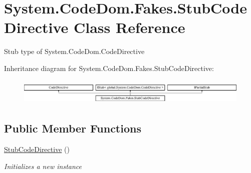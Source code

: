 \hypertarget{class_system_1_1_code_dom_1_1_fakes_1_1_stub_code_directive}{\section{System.\-Code\-Dom.\-Fakes.\-Stub\-Code\-Directive Class Reference}
\label{class_system_1_1_code_dom_1_1_fakes_1_1_stub_code_directive}
}


Stub type of System.\-Code\-Dom.\-Code\-Directive 


Inheritance diagram for System.\-Code\-Dom.\-Fakes.\-Stub\-Code\-Directive\-:\begin{figure}[H]
\begin{center}
\leavevmode
\includegraphics[height=1.269841cm]{class_system_1_1_code_dom_1_1_fakes_1_1_stub_code_directive}
\end{center}
\end{figure}
\subsection*{Public Member Functions}
\begin{DoxyCompactItemize}
\item 
\hyperlink{class_system_1_1_code_dom_1_1_fakes_1_1_stub_code_directive_abb82b993db2e7006368d1f5def3f57f6}{Stub\-Code\-Directive} ()
\begin{DoxyCompactList}\small\item\em Initializes a new instance\end{DoxyCompactList}\end{DoxyCompactItemize}
